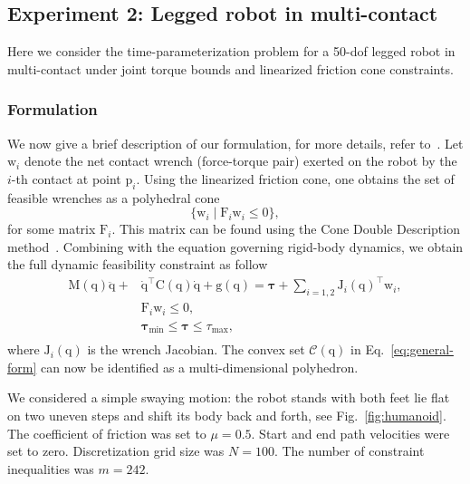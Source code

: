 \documentclass[journal]{IEEEtran}
\theoremstyle{plain}
\theoremstyle{definition}
\theoremstyle{definition}
\newcommand{\bftau}{\boldsymbol{\mathbf{\tau}}}
\renewcommand{\vec}[1]{\bm{\mathrm{#1}}}  %
\newcommand{\cC}{\mathscr{C}}
\begin{document}
\subsection{Experiment 2: Legged robot in multi-contact}
\label{sec:topp-subject-non}

Here we consider the time-parameterization problem for a 50-dof legged
robot in multi-contact under joint torque bounds and linearized
friction cone constraints.

\subsubsection{Formulation}

We now give a brief description of our formulation, for more details,
refer to~\cite{hauser2014,pham2015time}. Let $\vec w_{i}$ denote the
net contact wrench (force-torque pair) exerted on the robot by the
$i$-th contact at point $\vec p_{i}$. Using the linearized friction
cone, one obtains the set of feasible wrenches as a polyhedral cone
\begin{equation*}
 \{ \vec w_i \mid \vec F_i \vec w_i \leq 0\},
\end{equation*}
for some matrix $\vec F_{i}$. This matrix can be found using the Cone
Double Description method~\cite{fukuda1996double, Caron2017}.
Combining with the equation governing rigid-body dynamics, we obtain
the full dynamic feasibility constraint as follow
\begin{equation*}
  \begin{aligned}
    \vec M(\vec q)\ddot{\vec q}+&\dot{\vec q}^\top\vec C(\vec
    q)\dot{\vec q}+\vec g(\vec q)=\bftau + \sum_{i=1, 2} \vec
    J_{i}(\vec q)^{\top}\vec w_{i}, \\
    &\vec F_i \vec w_i \leq 0, \\
    &\bftau_{\min} \leq \bftau \leq \tau_{\max},\\
  \end{aligned}
\end{equation*}
where $\vec J_i(\vec q)$ is the wrench Jacobian.  The convex set
$\cC(\vec q)$ in Eq.~\eqref{eq:general-form} can now be identified as a
multi-dimensional polyhedron.

We considered a simple swaying motion: the robot stands with both feet
lie flat on two uneven steps and shift its body back and forth, see
Fig.~\ref{fig:humanoid}.  The coefficient of friction was set to
$\mu = 0.5$. Start and end path velocities were set to
zero. Discretization grid size was $N=100$. The number of constraint
inequalities was $m=242$.
\end{document}
